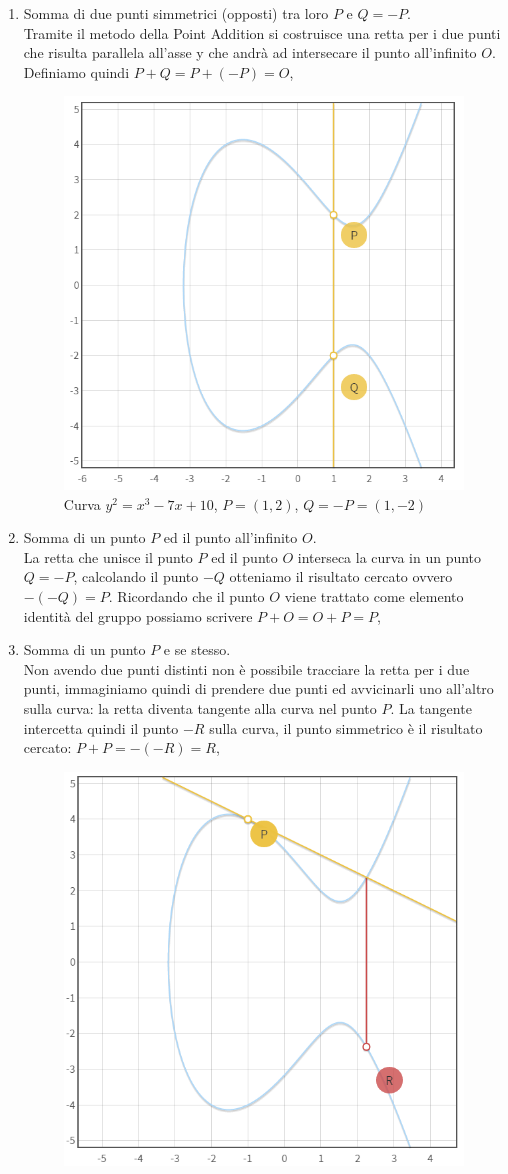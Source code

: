 \documentclass[a4paper,12pt]{tesiinfo}
\begin{document}
\begin{enumerate}
 \item Somma di due punti simmetrici (opposti) tra loro $P$ e $Q = -P$. 
 \\
 Tramite il metodo della Point Addition si costruisce una retta per i due punti che risulta parallela all'asse y che andr\`a ad intersecare il punto all'infinito $O$. Definiamo quindi $P + Q = P+(-P) = O$,
 \begin{figure}[H]
  \includegraphics[width=.6\textwidth,center]{PA_P+(-P)}
  \caption{Curva $y^2 = x^3-7x+10$, $P=(1, 2)$, $Q=-P=(1, -2)$}
 \end{figure}
 \item Somma di un punto $P$ ed il punto all'infinito $O$. 
 \\ 
 La retta che unisce il punto $P$ ed il punto $O$ interseca la curva in un punto $Q = -P$, calcolando il punto $-Q$ otteniamo il risultato cercato ovvero $-(-Q) = P$.
 Ricordando che il punto $O$ viene trattato come elemento identit\`a del gruppo possiamo scrivere $P+O = O+P = P$,
 \item Somma di un punto $P$ e se stesso. 
 \\
 Non avendo due punti distinti non \`e possibile tracciare la retta per i due punti, immaginiamo quindi di prendere due punti ed avvicinarli uno all'altro sulla curva: la retta diventa tangente alla curva nel punto $P$. La tangente intercetta quindi il punto $-R$ sulla curva, il punto simmetrico \`e il risultato cercato: $P + P = -(-R) = R$,
 \begin{figure}[H]
  \includegraphics[width=.6\textwidth,center]{PA_P+P}

\end{figure}
\end{enumerate}
\end{document}
